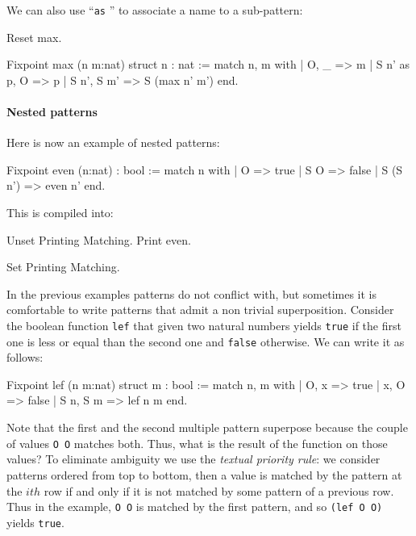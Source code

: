 We can also use ``\texttt{as} {\ident}'' to associate a name to a
sub-pattern:

\begin{coq_eval}
Reset max.
\end{coq_eval}
\begin{coq_example}
Fixpoint max (n m:nat) {struct n} : nat :=
  match n, m with
  | O, _ => m
  | S n' as p, O => p
  | S n', S m' => S (max n' m')
  end.
\end{coq_example}

\paragraph{Nested patterns}

Here is now an example of nested patterns:

\begin{coq_example}
Fixpoint even (n:nat) : bool :=
  match n with
  | O => true
  | S O => false
  | S (S n') => even n'
  end.
\end{coq_example}

This is compiled into:

\begin{coq_example}
Unset Printing Matching.
Print even.
\end{coq_example}
\begin{coq_eval}
Set Printing Matching.
\end{coq_eval}

In the previous examples patterns do not conflict with, but
sometimes it is comfortable to write patterns that admit a non
trivial superposition. Consider
the boolean function \texttt{lef} that given two natural numbers
yields \texttt{true} if the first one is less or equal than the second
one and \texttt{false} otherwise. We can write it as follows:

\begin{coq_example}
Fixpoint lef (n m:nat) {struct m} : bool :=
  match n, m with
  | O, x => true
  | x, O => false
  | S n, S m => lef n m
  end.
\end{coq_example}

Note that the first and the second multiple pattern superpose because
the couple of values \texttt{O O} matches both. Thus, what is the result
of the function on those values?  To eliminate ambiguity we use the
{\em textual priority rule}: we consider patterns ordered from top to
bottom, then a value is matched by the pattern at the $ith$ row if and
only if it is not matched by some pattern of a previous row. Thus in the
example,
\texttt{O O} is matched by the first pattern, and so \texttt{(lef O O)}
yields \texttt{true}.

